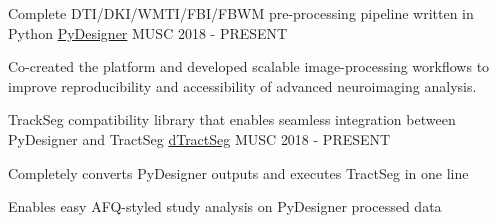 

\begin{cventries}

  \cventry
    {Complete DTI/DKI/WMTI/FBI/FBWM pre-processing pipeline written in Python} %
    {\href{https://github.com/m-ama/PyDesigner}{PyDesigner}} %
    {MUSC} %
    {2018 - PRESENT} %
    {
      \begin{cvitems} %
        \item {Co-created the platform and developed scalable image-processing workflows to improve reproducibility and accessibility of advanced neuroimaging analysis.}
   	  \end{cvitems}
    }

  \cventry
    {TrackSeg compatibility library that enables seamless integration between PyDesigner and TractSeg} %
    {\href{https://github.com/m-ama/dTractSeg}{dTractSeg}} %
    {MUSC} %
    {2018 - PRESENT} %
    {
      \begin{cvitems} %
        \item {Completely converts PyDesigner outputs and executes TractSeg in one line}
        \item {Enables easy AFQ-styled study analysis on PyDesigner processed data}
   	  \end{cvitems}
    }
    
\end{cventries}
